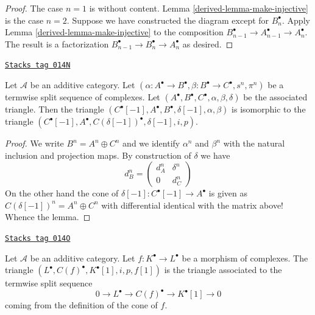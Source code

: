 \begin{proof}

The case $n = 1$ is without content.
Lemma \ref{derived-lemma-make-injective} is the case $n = 2$.
Suppose we have constructed the diagram
except for $B_n^\bullet$. Apply Lemma \ref{derived-lemma-make-injective} to
the composition $B_{n - 1}^\bullet \to A_{n - 1}^\bullet \to A_n^\bullet$.
The result is a factorization
$B_{n - 1}^\bullet \to B_n^\bullet \to A_n^\bullet$
as desired.
\end{proof}

\begin{lemma}
\label{derived-lemma-rotate-triangle}
\href{https://stacks.math.columbia.edu/tag/014N}{\texttt{Stacks tag 014N}}

Let $\mathcal{A}$ be an additive category. Let
$(\alpha : A^\bullet \to B^\bullet, \beta : B^\bullet \to C^\bullet, s^n,
\pi^n)$ be a termwise split sequence of complexes.
Let $(A^\bullet, B^\bullet, C^\bullet, \alpha, \beta, \delta)$
be the associated triangle.
Then the triangle
$(C^\bullet[-1], A^\bullet, B^\bullet, \delta[-1], \alpha, \beta)$
is isomorphic to the triangle
$(C^\bullet[-1], A^\bullet, C(\delta[-1])^\bullet, \delta[-1], i, p)$.
\end{lemma}

\begin{proof}
We write $B^n = A^n \oplus C^n$ and we identify $\alpha^n$ and $\beta^n$
with the natural inclusion and projection maps. By construction of $\delta$ we
have
$$
d_B^n =
\left(
\begin{matrix}
d_A^n & \delta^n \\
0 & d_C^n
\end{matrix}
\right)
$$
On the other hand the cone of $\delta[-1] : C^\bullet[-1] \to A^\bullet$
is given as $C(\delta[-1])^n = A^n \oplus C^n$ with differential identical
with the matrix above! Whence the lemma.
\end{proof}

\begin{lemma}
\label{derived-lemma-rotate-cone}
\href{https://stacks.math.columbia.edu/tag/014O}{\texttt{Stacks tag 014O}}

Let $\mathcal{A}$ be an additive category.
Let $f : K^\bullet \to L^\bullet$ be a morphism of complexes.
The triangle $(L^\bullet, C(f)^\bullet, K^\bullet[1], i, p, f[1])$ is
the triangle associated to the termwise split sequence
$$
0 \to L^\bullet \to C(f)^\bullet \to K^\bullet[1] \to 0
$$
coming from the definition of the cone of $f$.
\end{lemma}

